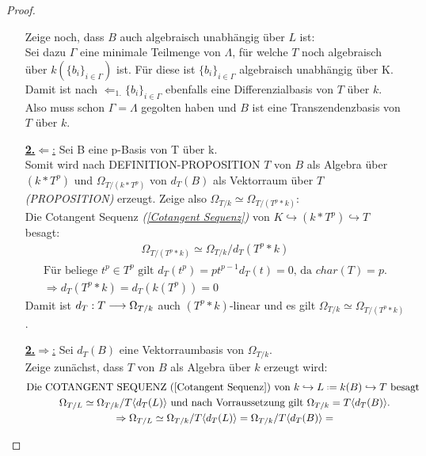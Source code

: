 \documentclass[10pt,a4paper]{report}
\newcommand{\comment}[1]{}
\newcommand{\functionfront}[3]{\nolinebreak{#1:#2 \longrightarrow #3}}
\newcommand{\divR}[2]{\Omega_{#1/#2}}
\newcommand{\divf}[1]{d_{#1}}
\newcommand*{\defeq}{\mathrel{\vcenter{\baselineskip0.5ex \lineskiplimit0pt
                     \hbox{\scriptsize.}\hbox{\scriptsize.}}}%
                     =}
\newcommand{\Verz}[1]{\langle #1 \rangle}
\begin{document}
\begin{proof}
\begin{itemize}
Zeige noch, dass $B$ auch algebraisch unabhängig über $L$ ist:\\
Sei dazu $\Gamma$ eine minimale Teilmenge von $\Lambda$, für welche $T$ noch algebraisch über $k(\lbrace b_i \rbrace_{i \in \Gamma})$ ist. Für diese ist $\lbrace b_i \rbrace_{i \in \Gamma}$ algebraisch unabhängig über K.\\
Damit ist nach \glqq$\Leftarrow_{1.}$\grqq $\lbrace b_i \rbrace_{i \in \Gamma}$ ebenfalls eine Differenzialbasis von $T$ über $k$. Also muss schon $\Gamma = \Lambda$ gegolten haben und $B$ ist eine Transzendenzbasis von $T$ über $k$.
\item[\underline{\textbf{2.}\glqq$\Leftarrow$\grqq:}] Sei B eine p-Basis von T über k.\\
Somit wird nach DEFINITION-PROPOSITION \comment{\label{*p-Basis ist minnimaler Erzeuger von T als Algebra}} $T$ von $B$ als Algebra über $(k * T^p)$ und $\divR{T}{(k * T^p)}$ von $\divf{T}(B)$ als Vektorraum über $T$ 
\textit{(PROPOSITION)} \comment{\label{*Differenzial vererbt Erzeugendensystem}} erzeugt. Zeige also $\divR{T}{k} \simeq \divR{T}{(T^p * k)}$:\\
Die Cotangent Sequenz \textit{(\cref{Cotangent Sequenz})} von $K \hookrightarrow (k * T^p) \hookrightarrow T$ besagt:
\begin{gather*}
\divR{T}{(T^p * k)} \simeq \divR{T}{k}/\divf{T}(T^p * k)
\end{gather*}
\begin{gather*}
\text{Für beliege } t^p \in T^p \text{ gilt } \divf{T}(t^p) = pt^{p-1}\divf{T}(t) = 0 \text{,  da }char(T) = p.\\
\Rightarrow \divf{T}(T^p * k) = \divf{T}(k(T^p)) = 0
\end{gather*}
Damit ist $\functionfront{\divf{T}}{T}{\divR{T}{k}}$ auch $(T^p *k)$-linear und es gilt $\divR{T}{k} \simeq \divR{T}{(T^p * k)}$.
\item[\underline{\textbf{2.}\glqq$\Rightarrow$\grqq:}] Sei $\divf{T}(B)$ eine Vektorraumbasis von $\divR{T}{k}$.\\
Zeige zunächst, dass $T$ von $B$ als Algebra über $k$ erzeugt wird:
\begin{gather*}
\text{Die COTANGENT SEQUENZ (\cref{Cotangent Sequenz}) von $k \hookrightarrow L \defeq k(B) \hookrightarrow T$ besagt }\\
\divR{T}{L} \simeq \divR{T}{k}/T \Verz{\divf{T}(L)} \text{ und nach Vorraussetzung gilt } \divR{T}{k} = T \langle \divf{T}(B) \rangle. \\
\Rightarrow \divR{T}{L} \simeq \divR{T}{k}/T\Verz{\divf{T}(L)} = \divR{T}{k}/T\Verz{\divf{T}(B)}=

\end{gather*}
\end{itemize}
\end{proof}
\end{document}

